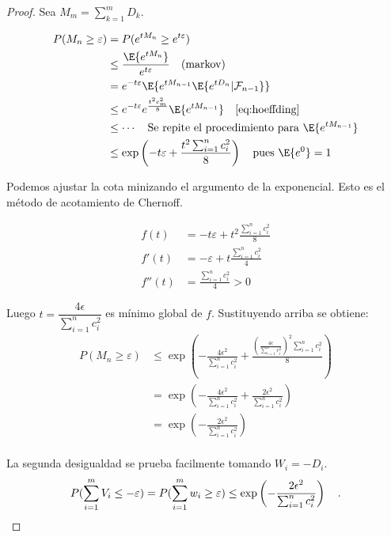 \begin{proof}
    Sea \(M_m = \sum^m_{k=1}D_k\).

    \begin{align*}
        P(M_n \geq \varepsilon) &= P(e^{tM_n} \geq e^{t\varepsilon})\\
                                &\leq \dfrac{\E{e^{tM_n}}}{e^{t\varepsilon}} \quad \text{(markov)} \\
                                &= e^{-t\varepsilon} \E{e^{tM_{n-1}}\E{e^{tD_n} | \mathcal{F}_{n-1}}}  \\
                                &\leq e^{-t\varepsilon} e^{\frac{t^2c_m^2}{8}}\E{e^{tM_{n-1}}} \quad \eqref{eq:hoeffding} \\
                                &\leq \cdots \quad \text{Se repite el procedimiento para } \E{e^{tM_{n-1}}} \\
                                &\leq \operatorname{exp}\left(-t\varepsilon +\frac{t^2\sum^n_{i=1}c_i^2}{8}\right) \quad \text{pues } \E{e^0}=1
    \end{align*}

    Podemos ajustar la cota minizando el argumento de la exponencial. Esto es el método de acotamiento de Chernoff.

    \begin{align*}
        f(t) &= -t\varepsilon + t^2\frac{\sum^n_{i=1}c_i^2}{8} \\
        f'(t) &= -\varepsilon + t\frac{\sum^n_{i=1}c_i^2}{4} \\
        f''(t) &= \frac{\sum^n_{i=1}c_i^2}{4} > 0
    \end{align*}

    Luego \(t=\dfrac{4\epsilon}{\sum^n_{i=1}c_i^2}\) es mínimo global de \(f\). Sustituyendo arriba se obtiene:
    \begin{align*}
        P(M_n \geq \varepsilon)  &\leq \operatorname{exp}\left(-\frac{4\epsilon^2}{\sum^n_{i=1}c_i^2} +\frac{(\frac{4\epsilon}{\sum^n_{i=1}c_i^2})^2\sum^n_{i=1}c_i^2}{8}\right) \\
                                &= \operatorname{exp}\left(-\frac{4\epsilon^2}{\sum^n_{i=1}c_i^2} + \frac{2\epsilon^2}{\sum^n_{i=1}c_i^2}\right) \\
                                &= \operatorname{exp}\left(-\frac{2\epsilon^2}{\sum^n_{i=1}c_i^2}\right) \\
    \end{align*}

    La segunda desigualdad se prueba facilmente tomando \(W_i = -D_i\).
    \begin{align*}
        P(\sum^m_{i=1} V_i \leq -\varepsilon) =  P(\sum^m_{i=1} w_i \geq \varepsilon) \leq \operatorname{exp}\left(-\frac{2\epsilon^2}{\sum^n_{i=1}c_i^2}\right) \quad \qedhere.
    \end{align*}
\end{proof}